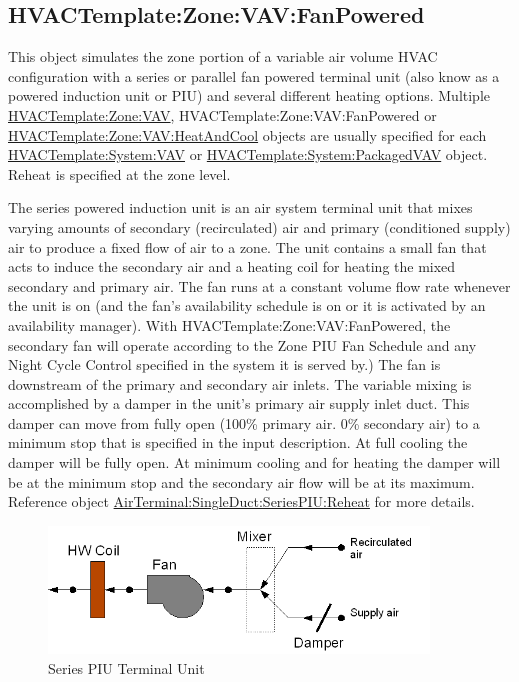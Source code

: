 \subsection{HVACTemplate:Zone:VAV:FanPowered}\label{hvactemplatezonevavfanpowered}

This object simulates the zone portion of a variable air volume HVAC configuration with a series or parallel fan powered terminal unit (also know as a powered induction unit or PIU) and several different heating options. Multiple \hyperref[hvactemplatezonevav]{HVACTemplate:Zone:VAV}, HVACTemplate:Zone:VAV:FanPowered or \hyperref[hvactemplatezonevavheatandcool]{HVACTemplate:Zone:VAV:HeatAndCool} objects are usually specified for each \hyperref[hvactemplatesystemvav]{HVACTemplate:System:VAV} or \hyperref[hvactemplatesystempackagedvav]{HVACTemplate:System:PackagedVAV} object. Reheat is specified at the zone level.

The series powered induction unit is an air system terminal unit that mixes varying amounts of secondary (recirculated) air and primary (conditioned supply) air to produce a fixed flow of air to a zone. The unit contains a small fan that acts to induce the secondary air and a heating coil for heating the mixed secondary and primary air. The fan runs at a constant volume flow rate whenever the unit is on (and the fan's availability schedule is on or it is activated by an availability manager). With HVACTemplate:Zone:VAV:FanPowered, the secondary fan will operate according to the Zone PIU Fan Schedule and any Night Cycle Control specified in the system it is served by.) The fan is downstream of the primary and secondary air inlets. The variable mixing is accomplished by a damper in the unit's primary air supply inlet duct. This damper can move from fully open (100\% primary air. 0\% secondary air) to a minimum stop that is specified in the input description. At full cooling the damper will be fully open. At minimum cooling and for heating the damper will be at the minimum stop and the secondary air flow will be at its maximum. Reference object \hyperref[airterminalsingleductseriespiureheat]{AirTerminal:SingleDuct:SeriesPIU:Reheat} for more details.

\begin{figure}[hbtp] %
\centering
\includegraphics[width=0.9\textwidth, height=0.9\textheight, keepaspectratio=true]{media/image608.png}
\caption{Series PIU Terminal Unit \protect \label{fig:series-piu-terminal-unit-001}}
\end{figure}

